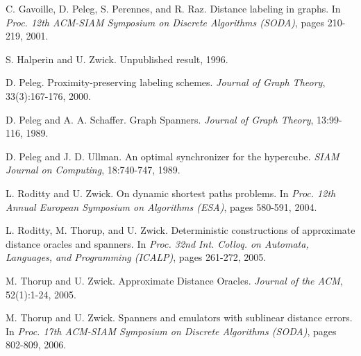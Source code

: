 \documentclass[a4paper,11pt]{article}
\theoremstyle{definition}
\begin{document}
\begin{thebibliography}{20}
C. Gavoille, D. Peleg, S. Perennes, and R. Raz.
Distance labeling in graphs.
In {\em Proc. 12th ACM-SIAM Symposium on Discrete Algorithms (SODA)}, pages 210-219, 2001.


S. Halperin and U. Zwick.
Unpublished result, 1996.

D. Peleg.
Proximity-preserving labeling schemes.
{\em Journal of Graph Theory}, 33(3):167-176, 2000.


D. Peleg and A. A. Schaffer.
Graph Spanners.
{\em Journal of Graph Theory}, 13:99-116, 1989.

D. Peleg and J. D. Ullman.
An optimal synchronizer for the hypercube.
{\em SIAM Journal on Computing}, 18:740-747, 1989.

L. Roditty and U. Zwick.
On dynamic shortest paths problems.
In {\em Proc. 12th Annual European Symposium on Algorithms (ESA)}, pages 580-591, 2004.


L. Roditty, M. Thorup, and U. Zwick.
Deterministic constructions of approximate distance oracles and spanners.
In {\em Proc. 32nd Int. Colloq. on Automata, Languages, and Programming (ICALP)}, pages 261-272, 2005.

M. Thorup and U. Zwick.
Approximate Distance Oracles.
{\em Journal of the ACM}, 52(1):1-24, 2005.


M. Thorup and U. Zwick.
Spanners and emulators with sublinear distance errors.
In {\em Proc. 17th ACM-SIAM Symposium on Discrete Algorithms (SODA)}, pages 802-809, 2006.


\end{thebibliography}
\end{document}
